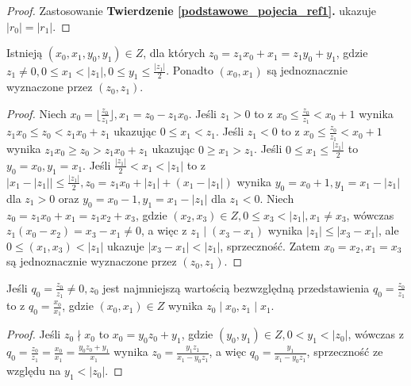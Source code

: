 \begin{appendices}
\begin{theorem}
\begin{proof}
Zastosowanie \textbf{Twierdzenie \ref{podstawowe_pojecia_ref1}.} ukazuje $|r_0| = |r_1|$.
\end{proof}
\end{theorem}
\begin{theorem}
Istnieją $(x_0, x_1, y_0, y_1) \in Z$, dla których $z_0 = z_1x_0 + x_1 = z_1y_0 + y_1$, gdzie $z_1 \neq 0, 0 \leq x_1 < |z_1|, 0 \leq y_1 \leq \frac{|z_1|}{2}$. Ponadto $(x_0, x_1)$ są jednoznacznie wyznaczone przez $(z_0, z_1)$.
\begin{proof}
Niech $x_0 = \lfloor \frac{z_0}{z_1} \rfloor, x_1 = z_0 - z_1x_0$. Jeśli $z_1 > 0$ to z $x_0 \leq \frac{z_0}{z_1} < x_0 + 1$ wynika $z_1x_0 \leq z_0 < z_1x_0 + z_1$ ukazując $0 \leq x_1 < z_1$. Jeśli $z_1 < 0$ to z $x_0 \leq \frac{z_0}{z_1} < x_0 + 1$ wynika $z_1x_0 \geq z_0 > z_1x_0 + z_1$ ukazując $0 \geq x_1 > z_1$. Jeśli $0 \leq x_1 \leq \frac{|z_1|}{2}$ to $y_0 = x_0, y_1 = x_1$. Jeśli $\frac{|z_1|}{2} < x_1 < |z_1|$ to z $|x_1 - |z_1|| \leq \frac{|z_1|}{2}, z_0 = z_1x_0 + |z_1| + (x_1 - |z_1|)$ wynika $y_0 = x_0 + 1, y_1 = x_1 - |z_1|$ dla $z_1 > 0$ oraz $y_0 = x_0 - 1, y_1 = x_1 - |z_1|$ dla $z_1 < 0$. Niech $z_0 = z_1x_0 + x_1 = z_1x_2 + x_3$, gdzie $(x_2, x_3) \in Z, 0 \leq x_3 < |z_1|, x_1 \neq x_3$, wówczas $z_1(x_0 - x_2) = x_3 - x_1 \neq 0$, a więc z $z_1 \mid (x_3 - x_1)$ wynika $|z_1| \leq |x_3 - x_1|$, ale $0 \leq (x_1, x_3) < |z_1|$ ukazuje $|x_3 - x_1| < |z_1|$, sprzeczność. Zatem $x_0 = x_2, x_1 = x_3$ są jednoznacznie wyznaczone przez $(z_0, z_1)$.
\end{proof}
\end{theorem}
\begin{theorem}
Jeśli $q_0 = \frac{z_0}{z_1} \neq 0, z_0$ jest najmniejszą wartością bezwzględną przedstawienia $q_0 = \frac{z_0}{z_1}$ to z $q_0 = \frac{x_0}{x_1}$, gdzie $(x_0, x_1) \in Z$ wynika $z_0 \mid x_0, z_1 \mid x_1$.
\begin{proof}
Jeśli $z_0 \nmid x_0$ to $x_0 = y_0z_0 + y_1$, gdzie $(y_0, y_1) \in Z, 0 < y_1 < |z_0|$, wówczas z $q_0 = \frac{z_0}{z_1} = \frac{x_0}{x_1} = \frac{y_0z_0 + y_1}{x_1}$ wynika $z_0 = \frac{y_1z_1}{x_1 - y_0z_1}$, a więc $q_0 = \frac{y_1}{x_1 - y_0z_1}$, sprzeczność ze względu na $y_1 < |z_0|$.
\end{proof}
\end{theorem}
\begin{theorem}

\end{theorem}
\end{appendices}
